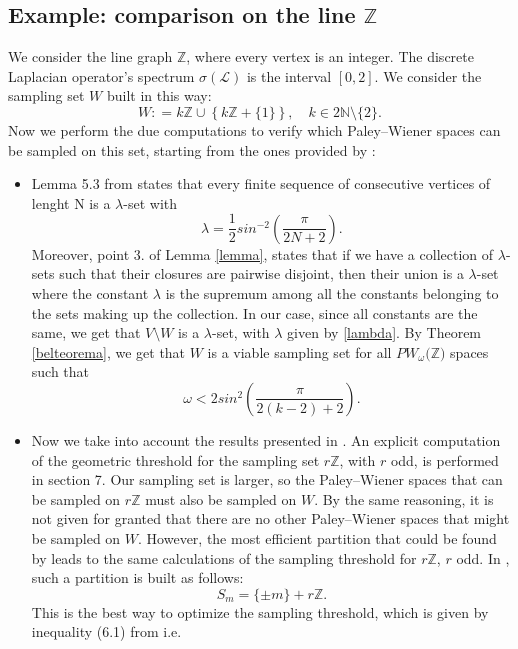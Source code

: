 \documentclass[12pt]{amsart}
\theoremstyle{definition}
\numberwithin{equation}{section}
\theoremstyle{definition}
\theoremstyle{remark}
\numberwithin{equation}{section}
\begin{document}
\subsection{Example: comparison on the line $\mathbb{Z}$}
We consider the line graph $\mathbb{Z}$, where every vertex is an integer. The discrete Laplacian operator's spectrum $\sigma(\mathcal{L})$ is the interval $[0,2]$. We consider the sampling set $W$ built in this way: 
$$
W : = k\mathbb{Z}\cup \left\{k\mathbb{Z}+ \{1\}\right\}, \quad k \in 2\mathbb{N}\setminus\{2\}.
$$
Now we perform the due computations to verify which Paley--Wiener spaces can be sampled on this set, starting from the ones provided by \cite{PW1}:
\begin{itemize}
    \item Lemma 5.3 from \cite{PW1} states that every finite sequence of consecutive vertices of lenght N is a $\lambda$-set with
    \begin{equation}
     \label{lambda}
     \lambda = \frac{1}{2}sin^{-2}\left(\frac{\pi}{2N + 2}\right).
    \end{equation}
    Moreover, point $3.$ of Lemma \ref{lemma}, states that if we have a collection of $\lambda$-sets such that their closures are pairwise disjoint, then their union is a $\lambda$-set where the constant $\lambda$ is the supremum among all the constants belonging to the sets making up the collection. In our case, since all constants are the same, we get that $V\setminus W$ is a $\lambda$-set, with $\lambda$ given by \ref{lambda}. By Theorem \ref{belteorema}, we get that $W$ is a viable sampling set for all $PW_\omega(\mathbb{Z)}$ spaces such that
    $$
    \omega < 2sin^2\left(\frac{\pi}{2(k-2) + 2}\right).
    $$
    \item Now we take into account the results presented in \cite{FP}. An explicit computation of the geometric threshold for the sampling set $r\mathbb{Z}$, with $r$ odd, is performed in section 7. Our sampling set is larger, so the Paley--Wiener spaces that can be sampled on $r\mathbb{Z}$ must also be sampled on $W$. By the same reasoning, it is not given for granted that there are no other Paley--Wiener spaces that might be sampled on $W$. However, the most efficient partition that could be found by \cite{FP} leads to the same calculations of the sampling threshold for $r\mathbb{Z}$, $r$ odd. In \cite{FP}, such a partition is built as follows:
    $$
    S_m = \{\pm m\} + r\mathbb{Z}. 
    $$
    This is the best way to optimize the sampling threshold, which is given by inequality (6.1) from \cite{FP} i.e.

\end{itemize}
\end{document}
